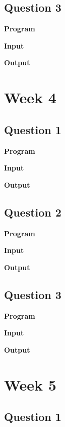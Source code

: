 \documentclass{article}
\begin{document}
\newpage
\subsection{Question 3}

\newline 

\noindent \textbf{\large{Program}}

\newpage
\noindent \textbf{\large{Input}}

\noindent \textbf{\large{Output}}

\newpage
\section{Week 4}

\subsection{Question 1}

\newline 

\noindent \textbf{\large{Program}}

\newpage
\noindent \textbf{\large{Input}}

\noindent \textbf{\large{Output}}


\newpage
\subsection{Question 2}

\newline 

\noindent \textbf{\large{Program}}

\newpage
\noindent \textbf{\large{Input}}

\noindent \textbf{\large{Output}}


\newpage
\subsection{Question 3}

\newline 

\noindent \textbf{\large{Program}}

\newpage
\noindent \textbf{\large{Input}}

\noindent \textbf{\large{Output}}

\newpage
\section{Week 5}

\subsection{Question 1}

\newline 
\end{document}
